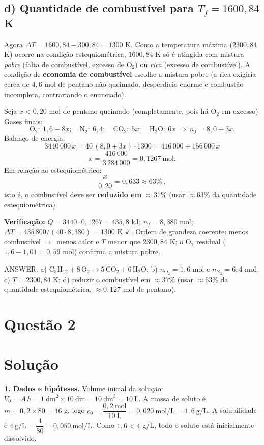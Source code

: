 \documentclass{article}%
\begin{document}
\subsection*{d) Quantidade de combustível para $T_f=1600{,}84$ K}
Agora $\Delta T=1600{,}84-300{,}84=1300$ K. Como a temperatura máxima ($2300{,}84$ K) ocorre na condição estequiométrica, $1600{,}84$ K só é atingida com mistura \emph{pobre} (falta de combustível, excesso de O$_2$) ou \emph{rica} (excesso de combustível). A condição de \textbf{economia de combustível} escolhe a mistura pobre (a rica exigiria cerca de $4{,}6$ mol de pentano não queimado, desperdício enorme e combustão incompleta, contrariando o enunciado).

Seja $x<0{,}20$ mol de pentano queimado (completamente, pois há O$_2$ em excesso). Gases finais:
\[
\mathrm{O_2}:\ 1{,}6-8x;\quad \mathrm{N_2}:\ 6{,}4;\quad \mathrm{CO_2}:\ 5x;\quad \mathrm{H_2O}:\ 6x
\ \Rightarrow\ n_f=8{,}0+3x .
\]
Balanço de energia:
\[
3440\,000\,x=40\,(8{,}0+3x)\cdot 1300=416\,000+156\,000\,x
\]
\[
x=\frac{416\,000}{3\,284\,000}=0{,}1267\ \mathrm{mol}.
\]
Em relação ao estequiométrico:
\[
\frac{x}{0{,}20}=0{,}633\approx 63\%\ ,
\]
isto é, o combustível deve ser \textbf{reduzido em $\approx 37\%$} (usar $\approx 63\%$ da quantidade estequiométrica).

\textbf{Verificação:} $Q=3440\cdot0{,}1267=435{,}8$ kJ; $n_f=8{,}380$ mol; $\Delta T=435\,800/(40\cdot 8{,}380)=1300$ K $\checkmark$. Ordem de grandeza coerente: menos combustível $\Rightarrow$ menos calor e $T$ menor que $2300{,}84$ K; o O$_2$ residual ($1{,}6-1{,}01=0{,}59$ mol) confirma a mistura pobre.

ANSWER: a) $\mathrm{C_5H_{12}+8\,O_2\to5\,CO_2+6\,H_2O}$; b) $n_{\mathrm{O_2}}=1{,}6$ mol e $n_{\mathrm{N_2}}=6{,}4$ mol; c) $T=2300{,}84$ K; d) reduzir o combustível em $\approx 37\%$ (usar $\approx 63\%$ da quantidade estequiométrica, $\approx 0{,}127$ mol de pentano).%
\newpage%
\section*{Questão 2}

\section*{Solução}
\pgfplotsset{compat=1.14}

\textbf{1. Dados e hipóteses.} Volume inicial da solução: $V_0=A\,h=1\ \text{dm}^2\times 10\ \text{dm}=10\ \text{dm}^3=10\ \text{L}$. A massa de soluto é $m=0{,}2\times 80=16$ g, logo $c_0=\dfrac{0{,}2\ \text{mol}}{10\ \text{L}}=0{,}020\ \text{mol/L}=1{,}6\ \text{g/L}$. A solubilidade é $4\ \text{g/L}=\dfrac{4}{80}=0{,}050\ \text{mol/L}$. Como $1{,}6<4$ g/L, todo o soluto está inicialmente dissolvido.
\end{document}
